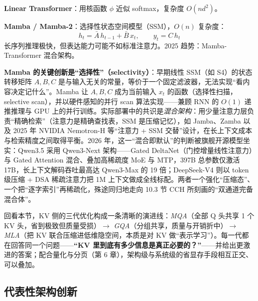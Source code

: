 \documentclass[12pt,a4paper]{article}
\begin{document}
\textbf{Linear Transformer}：用核函数 $\phi$ 近似 softmax，复杂度 $O(n d^2)$。

\textbf{Mamba / Mamba-2}：选择性状态空间模型（SSM），$O(n)$ 复杂度：
\[
h_t = \bar{A}\, h_{t-1} + \bar{B}\, x_t, \qquad y_t = C\, h_t
\]
长序列推理极快，但表达能力可能不如标准注意力。2025 趋势：Mamba-Transformer 混合架构。

\textbf{Mamba 的关键创新是“选择性”（selectivity）}：早期线性 SSM（如 S4）的状态转移矩阵 $A, B, C$ 是与输入无关的常量，等价于一个固定滤波器，无法实现“看内容决定记什么”。Mamba 让 $A, B, C$ 成为当前输入 $x_t$ 的函数（选择性扫描，selective scan），并以硬件感知的并行 scan 算法实现——兼顾 RNN 的 $O(1)$ 递推推理与 GPU 上的并行训练。实际部署中的共识是\emph{混合架构}：用少量注意力层负责“精确检索”（注意力是精确查找表，SSM 是压缩记忆），如 Jamba、Zamba 以及 2025 年 NVIDIA Nemotron-H 等“注意力 + SSM 交替”设计，在长上下文成本与检索精度之间取得平衡。2026 年，这一“混合即默认”的判断被旗舰开源模型坐实：Qwen3.5 采用 Qwen3-Next 架构——Gated DeltaNet（门控增量线性注意力）与 Gated Attention 混合、叠加高稀疏度 MoE 与 MTP，397B 总参数仅激活 17B，长上下文解码吞吐最高达 Qwen3-Max 的 19 倍；DeepSeek-V4 则以 token 级压缩 + DSA 稀疏注意力把 1M 上下文做成全线标配。两者一个强化“压缩态”、一个把“逐字索引”再稀疏化，殊途同归地走向 10.3 节 CCH 所刻画的“双通道完备混合体”。

回看本节，KV 侧的三代优化构成一条清晰的演进线：\emph{MQA}（全部 Q 头共享 1 个 KV 头，省到极致但质量受损）$\to$ \emph{GQA}（分组共享，质量与开销折中）$\to$ \emph{MLA}（把 KV 联合压缩进低维隐空间，本质是对 KV 做“表示学习”）。每一代都在回答同一个问题——\textbf{“KV 里到底有多少信息是真正必要的？”}——并给出更激进的答案；配合量化与分页（第 6 章），架构级与系统级的省显存手段相互正交、可以叠加。

\subsection{代表性架构创新}
\end{document}
